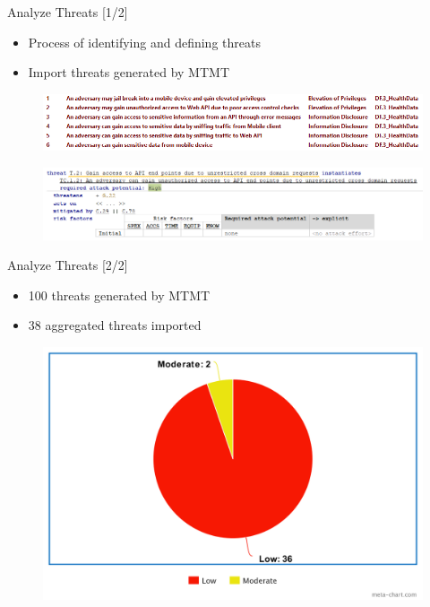 \documentclass[xcolor=table]{beamer}
\begin{document}
\begin{frame}{Analyze Threats [1/2]}
\begin{itemize}
    \item Process of identifying and defining threats
    \item Import threats generated by MTMT
\end{itemize}
 \begin{figure}[H]
  \includegraphics[width=\linewidth]{img/mtmt_threats.png}
  \label{fig:mtmt_threat}
\end{figure}
 \begin{figure}[H]
  \includegraphics[width=0.9\linewidth]{img/threat.png}
  \label{fig:threat}
\end{figure}
\end{frame}

\begin{frame}{Analyze Threats [2/2]}
\begin{itemize}
    \item 100 threats generated by MTMT
    \item 38 aggregated threats imported
\end{itemize}
 \begin{figure}[H]
  \includegraphics[width=0.9\linewidth]{img/threatchart.png}
  \label{fig:threatchart}
\end{figure}
\end{frame}
\end{document}
